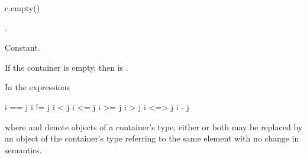%
\begin{itemdecl}
c.empty()
\end{itemdecl}

\begin{itemdescr}
\pnum
\result
{}.

\pnum
\returns
{}

\pnum
\complexity
Constant.

\pnum
\remarks
If the container is empty, then  is .
\end{itemdescr}

\pnum
In the expressions
\begin{codeblock}
i == j
i != j
i < j
i <= j
i >= j
i > j
i <=> j
i - j
\end{codeblock}
where  and  denote objects of a container's 
type, either or both may be replaced by an object of the container's
 type referring to the same element with no change in semantics.

